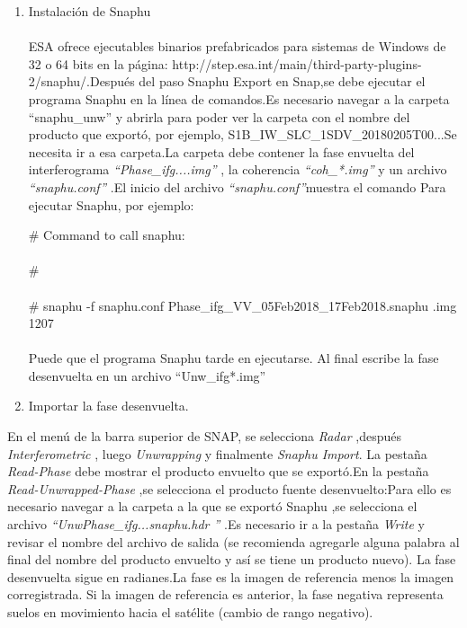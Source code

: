 \documentclass{article}
\begin{document}
\begin{enumerate}
	\item Instalación de Snaphu\\ \\
ESA  ofrece ejecutables binarios prefabricados para sistemas de Windows de 32 o 64 bits en la página: http://step.esa.int/main/third-party-plugins- 2/snaphu/.Después del paso Snaphu Export en Snap,se debe ejecutar el programa Snaphu en la línea de comandos.Es necesario navegar a la carpeta “snaphu\_unw” y abrirla para poder ver la carpeta con el nombre del producto que exportó, por ejemplo,
S1B\_IW\_SLC\_1SDV\_20180205T00...Se necesita ir a esa carpeta.La carpeta debe contener la fase envuelta del interferograma \textit{“Phase\_ifg....img”} , la coherencia \textit{“coh\_*.img”}  y un archivo \textit{“snaphu.conf”} .El inicio del archivo \textit{“snaphu.conf”}muestra el comando Para ejecutar Snaphu, por ejemplo:

\# Command to call snaphu:\\ \\
\# \\ \\
\# snaphu -f snaphu.conf Phase\_ifg\_VV\_05Feb2018\_17Feb2018.snaphu
.img 1207  \\ \\

Puede que el programa Snaphu tarde en ejecutarse. Al final escribe la fase
desenvuelta en un archivo “Unw\_ifg*.img”
	\item  Importar la fase desenvuelta.
\end{enumerate}
En el menú de la barra superior de SNAP, se selecciona \textit{Radar} ,después \textit{Interferometric} , luego \textit{Unwrapping}  y finalmente \textit{Snaphu Import}.
La pestaña \textit{Read-Phase}  debe mostrar el producto envuelto que se exportó.En la pestaña \textit{Read-Unwrapped-Phase} ,se selecciona el producto fuente desenvuelto:Para ello es necesario navegar a la carpeta a la que se exportó Snaphu ,se selecciona el archivo \textit{“UnwPhase\_ifg...snaphu.hdr
”} .Es necesario ir a la pestaña \textit{Write}  y revisar el nombre del archivo de salida (se recomienda agregarle alguna palabra al final del nombre del producto envuelto y así se tiene un producto nuevo).
La fase desenvuelta sigue en radianes.La fase es la imagen de referencia
menos la imagen corregistrada. Si la imagen de referencia es anterior, la
fase negativa representa suelos en movimiento hacia el satélite (cambio
de rango negativo).
\end{document}
